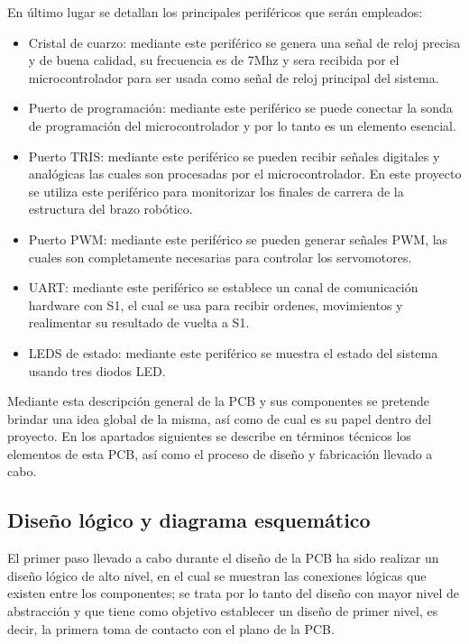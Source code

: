 En último lugar se detallan los principales periféricos que serán empleados:
\begin{itemize}
    \item Cristal de cuarzo: mediante este periférico se genera una señal de reloj precisa y de buena calidad, su frecuencia es de 7Mhz y sera recibida por el microcontrolador para ser usada como señal de reloj principal del sistema.
    \item Puerto de programación: mediante este periférico se puede conectar la sonda de programación del microcontrolador y por lo tanto es un elemento esencial.
    \item Puerto TRIS: mediante este periférico se pueden recibir señales digitales y analógicas las cuales son procesadas por el microcontrolador. En este proyecto se utiliza este periférico para monitorizar los finales de carrera de la estructura del brazo robótico.
    \item Puerto PWM: mediante este periférico se pueden generar señales PWM, las cuales son completamente necesarias para controlar los servomotores.
    \item UART: mediante este periférico se establece un canal de comunicación hardware con S1, el cual se usa para recibir ordenes, movimientos y realimentar su resultado de vuelta a S1.
    \item LEDS de estado: mediante este periférico se muestra el estado del sistema usando tres diodos LED.
\end{itemize}

Mediante esta descripción general de la PCB y sus componentes se pretende brindar una idea global de la misma, así como de cual es su papel dentro del proyecto. En los apartados siguientes se describe en términos técnicos los elementos de esta PCB, así como el proceso de diseño y fabricación llevado a cabo.

\subsection{Diseño lógico y diagrama esquemático}

El primer paso llevado a cabo durante el diseño de la PCB ha sido realizar un diseño lógico de alto nivel, en el cual se muestran las conexiones lógicas que existen entre los componentes; se trata por lo tanto del diseño con mayor nivel de abstracción y que tiene como objetivo establecer un diseño de primer nivel, es decir, la primera toma de contacto con el plano de la PCB.

